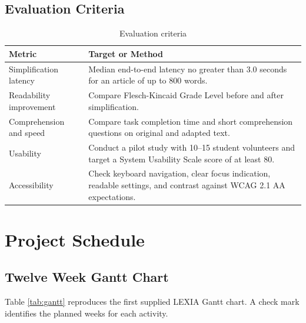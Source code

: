 \documentclass[a4paper]{tietreport}
\begin{document}
\section{Evaluation Criteria}
\begin{table}[H]
\centering
\begin{tabular}{p{} p{}}
\toprule
\textbf{Metric} & \textbf{Target or Method} \\
\midrule
Simplification latency & Median end-to-end latency no greater than 3.0 seconds for an article of up to 800 words. \\
Readability improvement & Compare Flesch-Kincaid Grade Level before and after simplification. \\
Comprehension and speed & Compare task completion time and short comprehension questions on original and adapted text. \\
Usability & Conduct a pilot study with 10--15 student volunteers and target a System Usability Scale score of at least 80. \\
Accessibility & Check keyboard navigation, clear focus indication, readable settings, and contrast against WCAG 2.1 AA expectations. \\
\bottomrule
\end{tabular}
\caption{Evaluation criteria}
\end{table}

\chapter{Project Schedule}
\section{Twelve Week Gantt Chart}
Table \ref{tab:gantt} reproduces the first supplied LEXIA Gantt chart. A check mark identifies the planned weeks for each activity.
\end{document}
